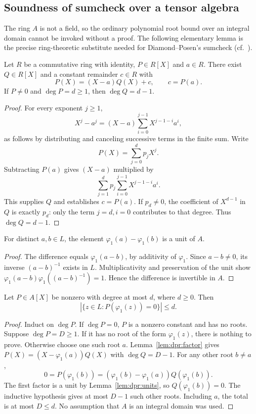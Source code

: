 \subsection{Soundness of sumcheck over a tensor algebra}\label{sec:dpr:sumcheck}
The ring $A$ is not a field, so the
ordinary polynomial root bound over
an integral domain cannot be invoked
without a proof. The following
elementary lemma is the precise
ring-theoretic substitute needed
for Diamond--Posen's sumcheck
(cf.~\cite[Lemma~4.5]{DiamondPosen2024}).

\begin{lemma}\label{lem:dpr:factor}
Let $R$ be a commutative ring with identity,
$P\in R[X]$ and $a\in R$.
There exist $Q\in R[X]$ and a constant
remainder $c\in R$ with
\[
 P(X)=(X-a)Q(X)+c,\qquad c=P(a).
\]
If $P\neq0$ and $\deg P=d\geq1$,
then $\deg Q=d-1$.
\end{lemma}
\begin{proof}
For every exponent $j\geq1$,
\[
 X^j-a^j=(X-a)
 \sum_{i=0}^{j-1}X^{j-1-i}a^i,
\]
as follows by distributing and canceling
successive terms in the finite sum.
Write
\[
 P(X)=\sum_{j=0}^dp_jX^j.
\]
Subtracting $P(a)$ gives $(X-a)$ multiplied by
\[
 \sum_{j=1}^dp_j\sum_{i=0}^{j-1}X^{j-1-i}a^i.
\]
This supplies $Q$ and establishes
$c=P(a)$. If $p_d\neq0$, the coefficient
of $X^{d-1}$ in $Q$ is exactly $p_d$:
only the term $j=d,i=0$ contributes
to that degree. Thus $\deg Q=d-1$.
\end{proof}

\begin{lemma}\label{lem:dpr:units}
For distinct $a,b\in L$,
the element $\varphi_1(a)-\varphi_1(b)$
is a unit of $A$.
\end{lemma}
\begin{proof}
The difference equals
$\varphi_1(a-b)$, by additivity
of $\varphi_1$. Since $a-b\neq0$,
its inverse $(a-b)^{-1}$ exists in $L$.
Multiplicativity and preservation of
the unit show
$\varphi_1(a-b)\varphi_1((a-b)^{-1})=1$.
Hence the difference is invertible in $A$.
\end{proof}

\begin{theorem}\label{thm:dpr:ring-roots}
Let $P\in A[X]$ be nonzero with
degree at most $d$, where $d\geq0$.
Then
\[
 \boxed{
 |\{z\in L:P(\varphi_1(z))=0\}|\leq d.}
\]
\end{theorem}
\begin{proof}
Induct on $\deg P$. If $\deg P=0$,
$P$ is a nonzero constant and has
no roots. Suppose $\deg P=D\geq1$.
If it has no root of the form
$\varphi_1(z)$, there is nothing to prove.
Otherwise choose one such root $a$.
Lemma~\ref{lem:dpr:factor} gives
$P(X)=(X-\varphi_1(a))Q(X)$ with
$\deg Q=D-1$.
For any other root $b\neq a$,
\[
 0=P(\varphi_1(b))
   =(\varphi_1(b)-\varphi_1(a))
                     Q(\varphi_1(b)).
\]
The first factor is a unit by
Lemma~\ref{lem:dpr:units}, so
$Q(\varphi_1(b))=0$.
The inductive hypothesis gives at
most $D-1$ such other roots.
Including $a$, the total is
at most $D\leq d$.
No assumption that $A$ is an
integral domain was used.
\end{proof}

